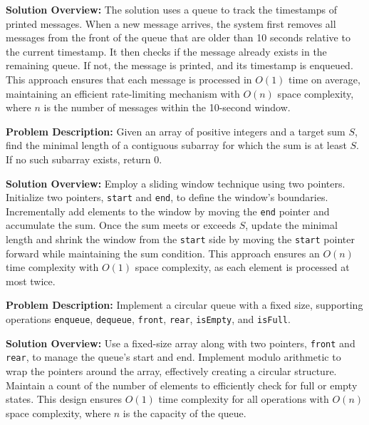 \textbf{Solution Overview:}  
The solution uses a queue to track the timestamps of printed messages. When a new message arrives, the system first removes all messages from the front of the queue that are older than 10 seconds relative to the current timestamp. It then checks if the message already exists in the remaining queue. If not, the message is printed, and its timestamp is enqueued. This approach ensures that each message is processed in \(O(1)\) time on average, maintaining an efficient rate-limiting mechanism with \(O(n)\) space complexity, where \(n\) is the number of messages within the 10-second window.


\textbf{Problem Description:}  
Given an array of positive integers and a target sum \(S\), find the minimal length of a contiguous subarray for which the sum is at least \(S\). If no such subarray exists, return 0.

\textbf{Solution Overview:}  
Employ a sliding window technique using two pointers. Initialize two pointers, \texttt{start} and \texttt{end}, to define the window's boundaries. Incrementally add elements to the window by moving the \texttt{end} pointer and accumulate the sum. Once the sum meets or exceeds \(S\), update the minimal length and shrink the window from the \texttt{start} side by moving the \texttt{start} pointer forward while maintaining the sum condition. This approach ensures an \(O(n)\) time complexity with \(O(1)\) space complexity, as each element is processed at most twice.


\textbf{Problem Description:}  
Implement a circular queue with a fixed size, supporting operations \texttt{enqueue}, \texttt{dequeue}, \texttt{front}, \texttt{rear}, \texttt{isEmpty}, and \texttt{isFull}.

\textbf{Solution Overview:}  
Use a fixed-size array along with two pointers, \texttt{front} and \texttt{rear}, to manage the queue's start and end. Implement modulo arithmetic to wrap the pointers around the array, effectively creating a circular structure. Maintain a count of the number of elements to efficiently check for full or empty states. This design ensures \(O(1)\) time complexity for all operations with \(O(n)\) space complexity, where \(n\) is the capacity of the queue.

